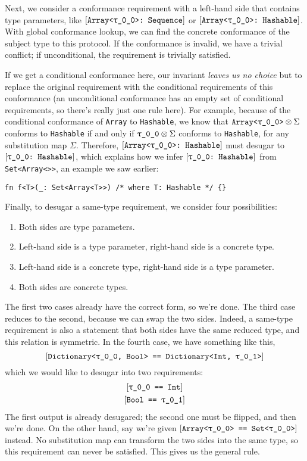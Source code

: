 \documentclass[../generics]{subfiles}
\begin{document}
\smallskip

Next, we consider a conformance requirement with a left-hand side that contains type parameters, like $\ConfReq{Array<\rT>}{Sequence}$ or $\ConfReq{Array<\rT>}{Hashable}$. With global conformance lookup, we can find the concrete conformance of the subject type to this protocol. If the conformance is invalid, we have a trivial conflict; if unconditional, the requirement is trivially satisfied.

If we get a conditional conformance here, our invariant \textsl{leaves us no choice} but to replace the original requirement with the conditional requirements of this conformance (an unconditional conformance has an empty set of conditional requirements, so there's really just one rule here). For example, because of the conditional conformance of \texttt{Array} to \texttt{Hashable}, we know that $\texttt{Array<\rT>}\otimes\Sigma$ conforms to \texttt{Hashable} if and only if $\rT\otimes\Sigma$ conforms to \texttt{Hashable}, for any substitution map $\Sigma$. Therefore, $\ConfReq{Array<\rT>}{Hashable}$ must desugar to $\ConfReq{\rT}{Hashable}$, which explains how we infer $\ConfReq{\rT}{Hashable}$ from \texttt{Set<Array<\rT>>}, an example we saw earlier:
\begin{Verbatim}
fn f<T>(_: Set<Array<T>>) /* where T: Hashable */ {}
\end{Verbatim}

Finally, to desugar a same-type requirement, we consider four possibilities:
\begin{enumerate}
\item Both sides are type parameters.
\item Left-hand side is a type parameter, right-hand side is a concrete type.
\item Left-hand side is a concrete type, right-hand side is a type parameter.
\item Both sides are concrete types.
\end{enumerate}
The first two cases already have the correct form, so we're done. The third case reduces to the second, because we can swap the two sides. Indeed, a same-type requirement is also a statement that both sides have the same reduced type, and this relation is symmetric. In the fourth case, we have something like this,
\[\SameReq{Dictionary<\rT, Bool>}{Dictionary<Int, \rU>}\]
which we would like to desugar into two requirements:
\begin{gather*}
\SameReq{\rT}{Int}\\
\SameReq{Bool}{\rU}
\end{gather*}
The first output is already desugared; the second one must be flipped, and then we're done. On the other hand, say we're given $\SameReq{Array<\rT>}{Set<\rT>}$ instead. No substitution map can transform the two sides into the same type, so this requirement can never be satisfied. This gives us the general rule.
\end{document}
